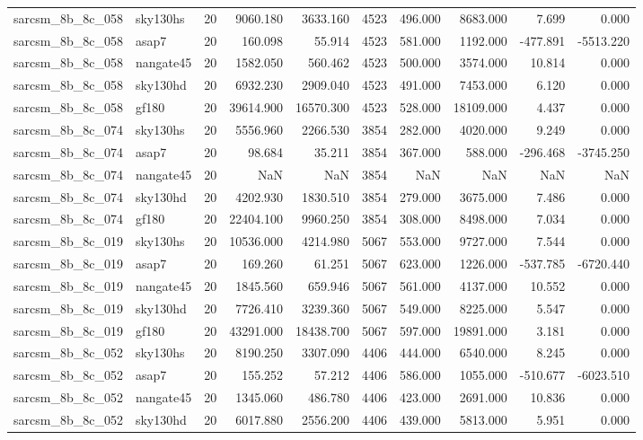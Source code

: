 \begin{tabular}{llrrrrrrrr}
sarcsm\_8b\_8c\_058 & sky130hs & 20 & 9060.180 & 3633.160 & 4523 & 496.000 & 8683.000 & 7.699 & 0.000 \\
sarcsm\_8b\_8c\_058 & asap7 & 20 & 160.098 & 55.914 & 4523 & 581.000 & 1192.000 & -477.891 & -5513.220 \\
sarcsm\_8b\_8c\_058 & nangate45 & 20 & 1582.050 & 560.462 & 4523 & 500.000 & 3574.000 & 10.814 & 0.000 \\
sarcsm\_8b\_8c\_058 & sky130hd & 20 & 6932.230 & 2909.040 & 4523 & 491.000 & 7453.000 & 6.120 & 0.000 \\
sarcsm\_8b\_8c\_058 & gf180 & 20 & 39614.900 & 16570.300 & 4523 & 528.000 & 18109.000 & 4.437 & 0.000 \\
sarcsm\_8b\_8c\_074 & sky130hs & 20 & 5556.960 & 2266.530 & 3854 & 282.000 & 4020.000 & 9.249 & 0.000 \\
sarcsm\_8b\_8c\_074 & asap7 & 20 & 98.684 & 35.211 & 3854 & 367.000 & 588.000 & -296.468 & -3745.250 \\
sarcsm\_8b\_8c\_074 & nangate45 & 20 & NaN & NaN & 3854 & NaN & NaN & NaN & NaN \\
sarcsm\_8b\_8c\_074 & sky130hd & 20 & 4202.930 & 1830.510 & 3854 & 279.000 & 3675.000 & 7.486 & 0.000 \\
sarcsm\_8b\_8c\_074 & gf180 & 20 & 22404.100 & 9960.250 & 3854 & 308.000 & 8498.000 & 7.034 & 0.000 \\
sarcsm\_8b\_8c\_019 & sky130hs & 20 & 10536.000 & 4214.980 & 5067 & 553.000 & 9727.000 & 7.544 & 0.000 \\
sarcsm\_8b\_8c\_019 & asap7 & 20 & 169.260 & 61.251 & 5067 & 623.000 & 1226.000 & -537.785 & -6720.440 \\
sarcsm\_8b\_8c\_019 & nangate45 & 20 & 1845.560 & 659.946 & 5067 & 561.000 & 4137.000 & 10.552 & 0.000 \\
sarcsm\_8b\_8c\_019 & sky130hd & 20 & 7726.410 & 3239.360 & 5067 & 549.000 & 8225.000 & 5.547 & 0.000 \\
sarcsm\_8b\_8c\_019 & gf180 & 20 & 43291.000 & 18438.700 & 5067 & 597.000 & 19891.000 & 3.181 & 0.000 \\
sarcsm\_8b\_8c\_052 & sky130hs & 20 & 8190.250 & 3307.090 & 4406 & 444.000 & 6540.000 & 8.245 & 0.000 \\
sarcsm\_8b\_8c\_052 & asap7 & 20 & 155.252 & 57.212 & 4406 & 586.000 & 1055.000 & -510.677 & -6023.510 \\
sarcsm\_8b\_8c\_052 & nangate45 & 20 & 1345.060 & 486.780 & 4406 & 423.000 & 2691.000 & 10.836 & 0.000 \\
sarcsm\_8b\_8c\_052 & sky130hd & 20 & 6017.880 & 2556.200 & 4406 & 439.000 & 5813.000 & 5.951 & 0.000 \\

\end{tabular}
